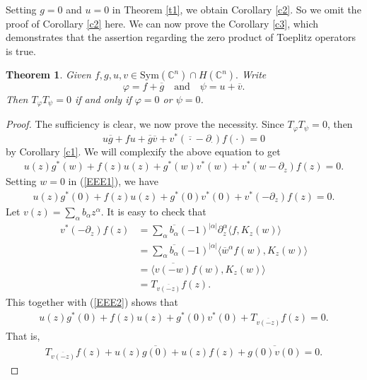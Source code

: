 \documentclass[11pt,reqno]{amsart}
\newtheorem{theorem}{Theorem}
\theoremstyle{definition}
\begin{document}
Setting $g=0$ and $u=0$ in Theorem \ref{t1},   we obtain  Corollary \ref{c2}.
So we omit the proof of Corollary \ref{c2} here.
We can now prove the Corollary \ref{c3}, which demonstrates that the assertion regarding the zero product of Toeplitz operators is  true.
\begin{theorem}\label{t2}
Given $f,g,u,v\in \mathrm{Sym}(\mathbb{C}^n)\cap H(\mathbb{C}^n).$ Write $$\varphi=f+\overline{g}\quad\text{and}\quad \psi=u+\overline{v}.$$ Then $T_\varphi T_\psi=0$ if and only if
 $\varphi=0$ or $\psi=0$.
\end{theorem}
\begin{proof}
The sufficiency is clear, we now prove the necessity.
Since $T_\varphi T_\psi=0$, then
$$u\overline{g}+fu+\overline{g}\overline{v}+v^*({\overline{\cdot}}-\partial_\cdot) f(\cdot)=0$$
by Corollary \ref{c1}. We will complexify the above equation to get
\begin{align}\label{EEE1}
u(z)g^*(w)+f(z)u(z)+g^*(w)v^*(w)+v^*(w-\partial_z) f(z)=0.
\end{align}
Setting $w=0$ in (\ref{EEE1}), we have
\begin{align}\label{EEE2}
u(z)g^*(0)+f(z)u(z)+g^*(0)v^*(0)+v^*(-\partial_z) f(z)=0.
\end{align}
Let $v(z)=\sum_\alpha b_\alpha z^\alpha.$ It is easy to check that
\begin{align*}
v^*(-\partial_z)f(z)&=\sum_{\alpha}\overline{b_\alpha}(-1)^{|\alpha|}\partial_z^\alpha\langle f, K_z(w)\rangle\\
&=\sum_{\alpha}\overline{b_\alpha}(-1)^{|\alpha|}\langle \overline{w}^\alpha f(w),K_z(w)\rangle\\
&=\langle \overline{v(-w)}f(w), K_z(w)\rangle\\
&=T_{\overline{v(-z)}}f(z).
\end{align*}
This together with (\ref{EEE2}) shows that
\begin{align*}
u(z)g^*(0)+f(z)u(z)+g^*(0)v^*(0)+T_{\overline{v(-z)}}f(z)=0.
\end{align*}
 That is,
\begin{align}\label{EEE3}
T_{\overline{v(-z)}}f(z)+u(z)\overline{g(0)}+u(z)f(z)+\overline{g(0)v(0)}=0.
\end{align}



\end{proof}
\end{document}
